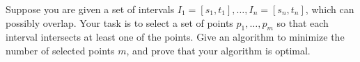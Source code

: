\problem{}
Suppose you are given a set of intervals $I_1 = [s_1, t_1], \ldots, I_n = [s_n, t_n]$, which can possibly overlap.  Your task is to select a set of points $p_1, \ldots, p_m$ so that each interval intersects at least one of the points.  Give an algorithm to minimize the number of selected points $m$, and prove that your algorithm is optimal.

\solution{}

















\newpage
